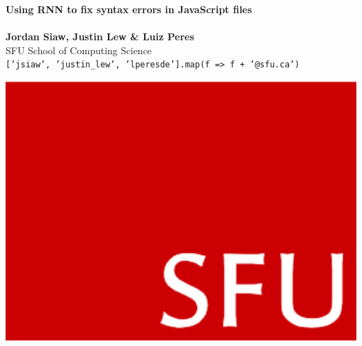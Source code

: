 \documentclass[a0,portrait]{a0poster}
\begin{document}


\begin{minipage}[b]{0.75\linewidth}
\veryHuge \color{NavyBlue} \textbf{Using RNN to fix syntax errors in JavaScript files} \color{Black}\\ %
\Huge\textit{}\\[2cm] %
\huge \textbf{Jordan Siaw, Justin Lew \& Luiz Peres}\\[0.5cm] %
\huge SFU School of Computing Science\\[0.4cm] %
\Large \texttt{[\color{NavyBlue}'jsiaw'\color{Black}, \color{NavyBlue}'justin\_lew'\color{Black}, \color{NavyBlue}'lperesde']\color{Black}.\color[rgb]{0.435, 0.258, 0.756}map\color{Black}(f \color[rgb]{0.843, 0.227, 0.286}=> \color{Black}f \color[rgb]{0.843, 0.227, 0.286}+ \color{NavyBlue}'@sfu.ca'\color{Black})}\\
\end{minipage}
%
\begin{minipage}[b]{0.25\linewidth}
\includegraphics[width=20cm]{logo.png}\\
\end{minipage}
\end{document}
